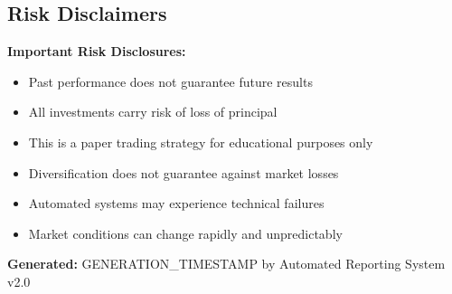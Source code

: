 \documentclass[11pt]{article}
\begin{document}
\subsection{Risk Disclaimers}

\begin{small}
\textbf{Important Risk Disclosures:}
\begin{itemize}
    \item Past performance does not guarantee future results
    \item All investments carry risk of loss of principal
    \item This is a paper trading strategy for educational purposes only
    \item Diversification does not guarantee against market losses
    \item Automated systems may experience technical failures
    \item Market conditions can change rapidly and unpredictably
\end{itemize}

\textbf{Generated:} {{GENERATION_TIMESTAMP}} by Automated Reporting System v2.0
\end{small}
\end{document}
